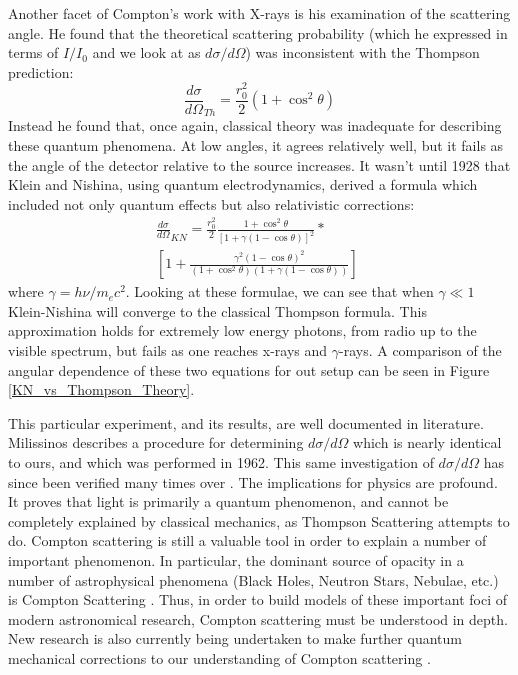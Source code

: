 \documentclass[%
 reprint,
 amsmath,amssymb,
 aps,
 pra,
]{revtex4-1}
\begin{document}
Another facet of Compton's work with X-rays is his examination of the scattering angle. He found that the theoretical scattering probability (which he expressed in terms of $I/I_0$ and we look at as $d\sigma / d\Omega$) was inconsistent with the Thompson prediction:
\begin{equation}\label{eq:thompson}
	\frac{d \sigma}{d \Omega}_{Th} = \frac{r_0^2}{2}(1+\cos^2{\theta})
\end{equation}
Instead he found that, once again, classical theory was inadequate for describing these quantum phenomena. At low angles, it agrees relatively well, but it fails as the angle of the detector relative to the source increases. It wasn't until 1928 that Klein and Nishina, using quantum electrodynamics, derived a formula which included not only quantum effects but also relativistic corrections\cite{kn_paper_original, eisberg}:
\begin{gather}
	\frac{d \sigma}{d \Omega}_{KN} = \frac{r_0^2}{2} \frac{1 + \cos^2{\theta}}{[1 + \gamma(1 - \cos{\theta})]^2} \nonumber * ~~~~~~~~~~~~ \\
	\left[ 1 + \frac{\gamma^2(1 - \cos{\theta})^2}{(1 + \cos^2{\theta})(1+ \gamma(1 - \cos{\theta}))}\right] 
	\label{eq:kn}
\end{gather}
where $\gamma = h\nu / m_e c^2$. Looking at these formulae, we can see that when $\gamma \ll 1$ Klein-Nishina will converge to the classical Thompson formula. This approximation holds for extremely low energy photons, from radio up to the visible spectrum, but fails as one reaches x-rays and $\gamma$-rays. A comparison of the angular dependence of these two equations for out setup can be seen in Figure \ref{KN_vs_Thompson_Theory}.

This particular experiment, and its results, are well documented in literature. Milissinos\cite{milissinos} describes a procedure for determining $d\sigma / d\Omega$ which is nearly identical to ours, and which was performed in 1962. This same investigation of $d\sigma / d\Omega$ has since been verified many times over \cite{angle_1, angle_2, angle_3}. The implications for physics are profound. It proves that light is primarily a quantum phenomenon, and cannot be completely explained by classical mechanics, as Thompson Scattering attempts to do. Compton scattering is still a valuable tool in order to explain a number of important phenomenon. In particular, the dominant source of opacity in a number of astrophysical phenomena (Black Holes, Neutron Stars, Nebulae, etc.) is Compton Scattering \cite{nstars}. Thus, in order to build models of these important foci of modern astronomical research, Compton scattering must be understood in depth. New research is also currently being undertaken to make further quantum mechanical corrections to our understanding of Compton scattering \cite{comptonresearch}.
\end{document}
